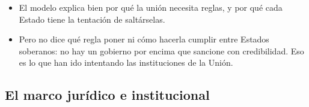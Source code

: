\documentclass[11pt]{article}
\begin{document}
\begin{itemize}
\item El modelo explica bien por qué la unión necesita reglas, y por qué cada Estado tiene la tentación de saltárselas.
\item Pero no dice qué regla poner ni cómo hacerla cumplir entre Estados soberanos: no hay un gobierno por encima que sancione con credibilidad. Eso es lo que han ido intentando las instituciones de la Unión.
\end{itemize}

\subsection{El marco jurídico e institucional}\label{sec:instituciones}
\end{document}
